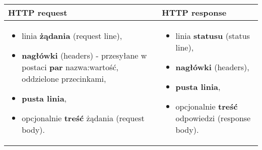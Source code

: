 \documentclass[../main.tex]{subfiles}
\begin{document}
    \begin{table}[H]
        \begin{center}
            \begin{tabular}{|p{8cm}|p{8cm}|}
                \hline
                \textbf{HTTP request} & \textbf{HTTP response}\\
                \hline
                \hline
                \begin{itemize}
                    \item linia \textbf{żądania} (request line),
                    \item \textbf{nagłówki} (headers) - przesyłane w postaci \textbf{par} nazwa:wartość, oddzielone przecinkami,
                    \item \textbf{pusta linia},
                    \item opcjonalnie \textbf{treść} żądania (request body).
                \end{itemize}
                &
                \begin{itemize}
                    \item linia \textbf{statusu} (status line),
                    \item \textbf{nagłówki} (headers),
                    \item \textbf{pusta linia},
                    \item opcjonalnie \textbf{treść} odpowiedzi (response body).
                \end{itemize}\\
                \hline
            \end{tabular}
        \end{center}
    \end{table}
\end{document}
